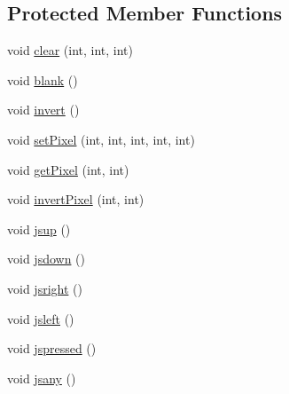 \subsection*{Protected Member Functions}
\begin{DoxyCompactItemize}
\item 
void \hyperlink{class_roomba_sense_h_a_t_a88a17837a2404ac4f27a924a0ae7fe54}{clear} (int, int, int)
\item 
void \hyperlink{class_roomba_sense_h_a_t_aeffae699ba80f658b1ee9eaae1eec02f}{blank} ()
\item 
void \hyperlink{class_roomba_sense_h_a_t_a3b6bf910dc5094fb7d33c46391f254d3}{invert} ()
\item 
void \hyperlink{class_roomba_sense_h_a_t_ab4505f815eec5eb5cbf07328252452cf}{set\+Pixel} (int, int, int, int, int)
\item 
void \hyperlink{class_roomba_sense_h_a_t_a98a46d008d2fcc4213e838e77e75b4ed}{get\+Pixel} (int, int)
\item 
void \hyperlink{class_roomba_sense_h_a_t_a967e46be000a155dfc3500591fd99b30}{invert\+Pixel} (int, int)
\item 
void \hyperlink{class_roomba_sense_h_a_t_a48f5aa05abb5d09e6fcf5b557d6f5e85}{jsup} ()
\item 
void \hyperlink{class_roomba_sense_h_a_t_a7f13756bd78266bd9472b82162c2d0a0}{jsdown} ()
\item 
void \hyperlink{class_roomba_sense_h_a_t_addf0970f6be2476ef2a8f99ad076a126}{jsright} ()
\item 
void \hyperlink{class_roomba_sense_h_a_t_a3c95037a3029d463e3fb9b09c33c6951}{jsleft} ()
\item 
void \hyperlink{class_roomba_sense_h_a_t_a7152dba35234970a98ed54b17bf2552b}{jspressed} ()
\item 
void \hyperlink{class_roomba_sense_h_a_t_a5bf1619e5171d1a870de74d86d6c97e3}{jsany} ()
\end{DoxyCompactItemize}
